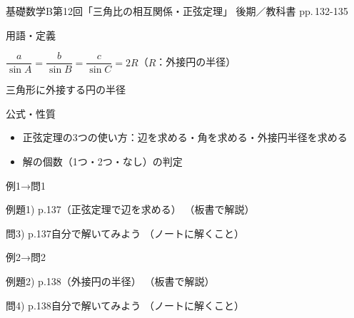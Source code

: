 \documentclass[aspectratio=43,professionalfonts,handout]{beamer}
\newcommand{\LectureNum}{12}
\newcommand{\LectureTitle}{三角比の相互関係・正弦定理}
\newcommand{\TextPages}{pp.\,132-135}
\newcommand{\CourseName}{基礎数学B}
\renewcommand{\TermName}{後期}
\begin{document}
\begin{frame}{\CourseName\quad 第\LectureNum 回「\LectureTitle 」}
  {\small \TermName\quad \TeacherName\quad ／\quad 教科書 \TextPages}

  \begin{block}{用語・定義}
  \begin{description}[labelwidth=5.5em]
    \item[\kw{正弦定理：$a/\sin A = b/\sin B = c/\sin C = 2R$}] $\dfrac{a}{\sin A} = \dfrac{b}{\sin B} = \dfrac{c}{\sin C} = 2R$（$R$：外接円の半径）
    \item[\kw{外接円の半径 $R$}] 三角形に外接する円の半径
  \end{description}
  \end{block}
\end{frame}

\begin{frame}{公式・性質}
  \begin{block}{}
  \begin{itemize}
    \item 正弦定理の3つの使い方：辺を求める・角を求める・外接円半径を求める
    \item 解の個数（1つ・2つ・なし）の判定
  \end{itemize}
  \end{block}
\end{frame}

\begin{frame}{例1→問1}
  \begin{exampleblock}{例題1) p.137（正弦定理で辺を求める）}
    （板書で解説）
  \end{exampleblock}

  \vfill

  \begin{block}{問3) p.137\quad 自分で解いてみよう}
    （ノートに解くこと）
  \end{block}
\end{frame}

\begin{frame}{例2→問2}
  \begin{exampleblock}{例題2) p.138（外接円の半径）}
    （板書で解説）
  \end{exampleblock}

  \vfill

  \begin{block}{問4) p.138\quad 自分で解いてみよう}
    （ノートに解くこと）
  \end{block}
\end{frame}
\end{document}
